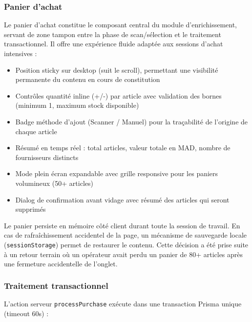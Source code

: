 \documentclass[12pt,a4paper,openany]{report}
\newcommand{\code}[1]{\texttt{#1}}
\begin{document}
\subsubsection{Panier d'achat}

Le panier d'achat constitue le composant central du module d'enrichissement, servant de zone tampon entre la phase de scan/sélection et le traitement transactionnel. Il offre une expérience fluide adaptée aux sessions d'achat intensives :

\begin{itemize}
  \item Position sticky sur desktop (suit le scroll), permettant une visibilité permanente du contenu en cours de constitution
  \item Contrôles quantité inline (+/-) par article avec validation des bornes (minimum 1, maximum stock disponible)
  \item Badge méthode d'ajout (Scanner / Manuel) pour la traçabilité de l'origine de chaque article
  \item Résumé en temps réel : total articles, valeur totale en MAD, nombre de fournisseurs distincts
  \item Mode plein écran expandable avec grille responsive pour les paniers volumineux (50+ articles)
  \item Dialog de confirmation avant vidage avec résumé des articles qui seront supprimés
\end{itemize}

Le panier persiste en mémoire côté client durant toute la session de travail. En cas de rafraîchissement accidentel de la page, un mécanisme de sauvegarde locale (\code{sessionStorage}) permet de restaurer le contenu. Cette décision a été prise suite à un retour terrain où un opérateur avait perdu un panier de 80+ articles après une fermeture accidentelle de l'onglet.

\subsubsection{Traitement transactionnel}

L'action serveur \code{processPurchase} exécute dans une transaction Prisma unique (timeout 60s) :
\end{document}
